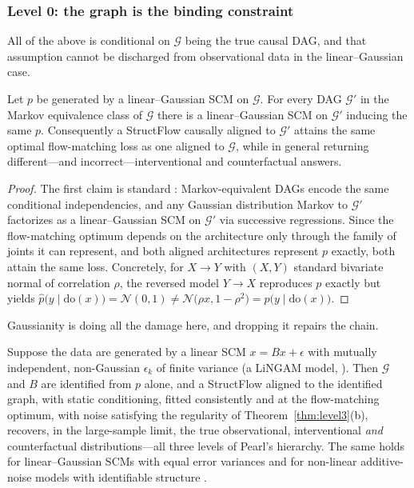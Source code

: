 \subsubsection{Level 0: the graph is the binding constraint}

All of the above is conditional on $\mathcal{G}$ being the true causal DAG, and that
assumption cannot be discharged from observational data in the linear--Gaussian case.

\begin{proposition}
\label{prop:mec}
Let $p$ be generated by a linear--Gaussian SCM on $\mathcal{G}$. For every DAG $\mathcal{G}'$
in the Markov equivalence class of $\mathcal{G}$ there is a linear--Gaussian SCM on
$\mathcal{G}'$ inducing the same $p$. Consequently a StructFlow causally aligned to
$\mathcal{G}'$ attains the same optimal flow-matching loss as one aligned to $\mathcal{G}$,
while in general returning different---and incorrect---interventional and counterfactual
answers.
\end{proposition}

\begin{proof}
The first claim is standard \citep{Peters2017}: Markov-equivalent DAGs encode the same
conditional independencies, and any Gaussian distribution Markov to $\mathcal{G}'$ factorizes
as a linear--Gaussian SCM on $\mathcal{G}'$ via successive regressions. Since the
flow-matching optimum depends on the architecture only through the family of joints it can
represent, and both aligned architectures represent $p$ exactly, both attain the same loss.
Concretely, for $X \to Y$ with $(X,Y)$ standard bivariate normal of correlation $\rho$, the
reversed model $Y \to X$ reproduces $p$ exactly but yields
$\hat p\bigl(y \mid \mathrm{do}(x)\bigr) = \mathcal{N}(0,1) \neq
\mathcal{N}\bigl(\rho x, 1-\rho^2\bigr) = p\bigl(y \mid \mathrm{do}(x)\bigr)$.
\end{proof}

Gaussianity is doing all the damage here, and dropping it repairs the chain.

\begin{corollary}
\label{cor:lingam}
Suppose the data are generated by a linear SCM $x = Bx + \epsilon$ with mutually independent,
non-Gaussian $\epsilon_k$ of finite variance (a LiNGAM model,
\citealp{shimizu2006lingam}). Then $\mathcal{G}$ and $B$ are identified from $p$ alone, and a StructFlow aligned to the identified graph, with static conditioning, fitted
consistently and at the flow-matching optimum, with noise satisfying the regularity of
Theorem~\ref{thm:level3}(b), recovers, in the
large-sample limit, the true observational, interventional \emph{and} counterfactual
distributions---all three levels of Pearl's hierarchy. The same holds for linear--Gaussian
SCMs with equal error variances \citep{peters2014identifiability} and for non-linear
additive-noise models with identifiable structure \citep{hoyer2008nonlinear}.
\end{corollary}

